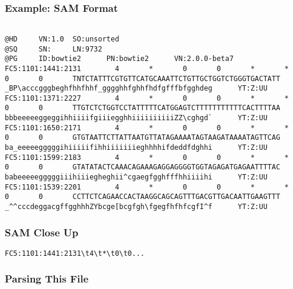 \begin{frame}[fragile]
\frametitle{Example: SAM Format}
\begin{verbatim}

@HD     VN:1.0  SO:unsorted
@SQ     SN:     LN:9732
@PG     ID:bowtie2      PN:bowtie2      VN:2.0.0-beta7
FC5:1101:1441:2131        4       *       0       0       *       *       0       0       TNTCTATTTCGTGTTCATGCAAATTCTGTTGCTGGTCTGGGTGACTATT       _BP\acccgggbeghfhhfhhf_gggghhfghhfhdfgfffbfgghdeg      YT:Z:UU
FC5:1101:1371:2227        4       *       0       0       *       *       0       0       TTGTCTCTGGTCCTATTTTTCATGGAGTCTTTTTTTTTTTCACTTTTAA       bbbeeeeeggeggihhiiiifgiiiegghhiiiiiiiiiiZZ\cghgd`      YT:Z:UU
FC5:1101:1650:2171        4       *       0       0       *       *       0       0       GTGTAATTCTTATTAATGTTATAGAAAATAGTAAGATAAAATAGTTCAG       ba_eeeeegggggihiiiiifihhiiiiiiieghhhhifdeddfdghhi      YT:Z:UU
FC5:1101:1599:2183        4       *       0       0       *       *       0       0       GTATATACTCAAACAGAAAGAGGAGGGGTGGTAGAGATGAGAATTTTAC       babeeeeegggggiiihiiiegheghii^cgaegfgghfffhhiiiihi      YT:Z:UU
FC5:1101:1539:2201        4       *       0       0       *       *       0       0       CCTTCTCAGAACCACTAAGGCAGCAGTTTGACGTTGACAATTGAAGTTT       _^^cccdeggacgffgghhhZYbcge[bcgfgh\fgegfhfhfcgfI^f      YT:Z:UU
\end{verbatim}
\end{frame}

\begin{frame}[fragile]
\frametitle{SAM Close Up}

\begin{verbatim}
FC5:1101:1441:2131\t4\t*\t0\t0...
\end{verbatim}

\end{frame}

\begin{frame}[fragile]
\frametitle{Parsing This File}

\end{frame}

